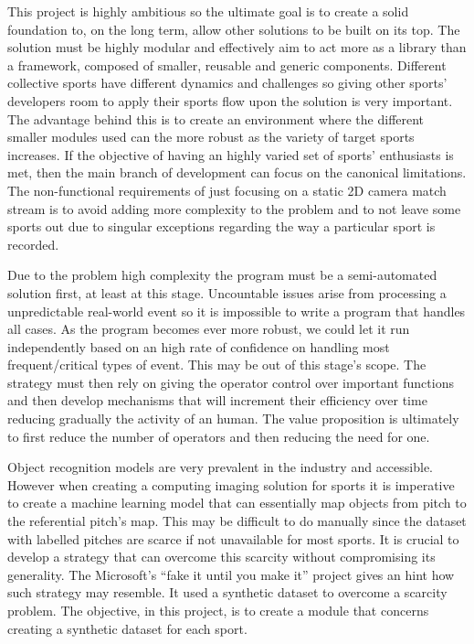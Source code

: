 \documentclass[
11pt,
twoside
]{report}
\begin{document}
This project is highly ambitious so the ultimate goal is to create a solid foundation to, on the long term, allow other solutions to be built on its top. The solution must be highly modular and effectively aim to act more as a library than a framework, composed of smaller, reusable and generic components. Different collective sports have different dynamics and challenges so giving other sports' developers room to apply their sports flow upon the solution is very important. The advantage behind this is to create an environment where the different smaller modules used can the more robust as the variety of target sports increases. If the objective of having an highly varied set of sports' enthusiasts is met, then the main branch of development can focus on the canonical limitations. The non-functional requirements of just focusing on a static 2D camera match stream is to avoid adding more complexity to the problem and to not leave some sports out due to singular exceptions regarding the way a particular sport is recorded.


Due to the problem high complexity the program must be a semi-automated solution first, at least at this stage. Uncountable issues arise from processing a unpredictable real-world event so it is impossible to write a program that handles all cases. As the program becomes ever more robust, we could let it run independently based on an high rate of confidence on handling most frequent/critical types of event. This may be out of this stage's scope. The strategy must then rely on giving the operator control over important functions and then develop mechanisms that will increment their efficiency over time reducing gradually the activity of an human. The value proposition is ultimately to first reduce the number of operators and then reducing the need for one.


Object recognition models are very prevalent in the industry and accessible. However when creating a computing imaging solution for sports it is imperative to create a machine learning model that can essentially map objects from pitch to the referential pitch's map. This may be difficult to do manually since the dataset with labelled pitches are scarce if not unavailable for most sports. It is crucial to develop a strategy that can overcome this scarcity without compromising its generality. The Microsoft's ``fake it until you make it'' project \cite{ms_fake} gives an hint how such strategy may resemble. It used a synthetic dataset to overcome a scarcity problem. The objective, in this project, is to create a module that concerns creating a synthetic dataset for each sport.
\end{document}
